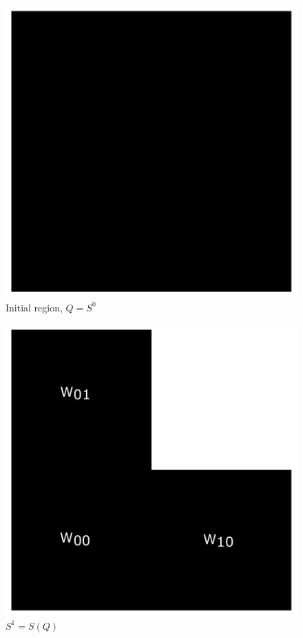 \documentclass{beamer}
\begin{document}
\begin{frame}
    \begin{figure}
        \centering
        \includegraphics[scale=0.5]{0.pdf}
        \caption{Initial region, $Q = S^0$}
    \end{figure}
\end{frame}

\begin{frame}
    \begin{figure}
        \centering
        \includegraphics[scale=0.5]{1.pdf}
        \caption{$S^1 = S(Q)$}
    \end{figure}
\end{frame}
\end{document}
